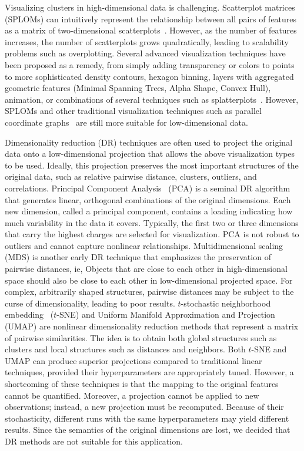 \documentclass[
  oneside]{book}
\begin{document}
Visualizing clusters in high-dimensional data is challenging.
Scatterplot matrices (SPLOMs) can intuitively represent the
relationship between all pairs of features as a matrix of two-dimensional scatterplots~\autocite{Im:GPLOM2013,Klemm:RegressionHeatmap2015}.
However, as the number of features increases, the number of scatterplots grows quadratically, leading to scalability problems such as overplotting.
Several advanced visualization techniques have been proposed as a remedy, from simply adding transparency or colors to points to more sophisticated density contours, hexagon binning, layers with aggregated geometric features (Minimal Spanning Trees, Alpha Shape, Convex Hull), animation, or combinations of several techniques such as
splatterplots~\autocite{Mayorga:Splatterplots2013}.
However, SPLOMs and other traditional visualization techniques such as parallel coordinate graphs~\autocite{Hartigan:PCC1975} are still more suitable for low-dimensional data.

Dimensionality reduction (DR) techniques are often used to project the original data onto a low-dimensional projection that allows the above visualization types to be used.
Ideally, this projection preserves the most important structures of the original data, such as relative pairwise distance, clusters, outliers, and correlations.
Principal Component Analysis~\autocite{Hotelling:PCA1933} (PCA) is a seminal DR algorithm that generates linear, orthogonal combinations of the original dimensions.
Each new dimension, called a principal component, contains a loading indicating how much variability in the data it covers.
Typically, the first two or three dimensions that carry the highest charges are selected for visualization.
PCA is not robust to outliers and cannot capture nonlinear relationships.
Multidimensional scaling~\autocite{Gower:MDS1966} (MDS) is another early DR technique that emphasizes the preservation of pairwise distances, ie,
Objects that are close to each other in high-dimensional space should also be close to each other in low-dimensional projected space.
For complex, arbitrarily shaped structures, pairwise distances may be subject to the curse of dimensionality, leading to poor results.
\(t\)-stochastic neighborhood embedding~\autocite{VanDerMaaten:tSNE2008} (\(t\)-SNE) and Uniform Manifold Approximation and Projection~\autocite{mcinnes2018umap} (UMAP) are nonlinear dimensionality reduction methods that represent a matrix of pairwise similarities.
The idea is to obtain both global structures such as clusters and local structures such as distances and neighbors.
Both \(t\)-SNE and UMAP can produce superior projections compared to traditional linear techniques, provided their hyperparameters are appropriately tuned.
However, a shortcoming of these techniques is that the mapping to the original features cannot be quantified.
Moreover, a projection cannot be applied to new observations; instead, a new projection must be recomputed.
Because of their stochasticity, different runs with the same hyperparameters may yield different results.
Since the semantics of the original dimensions are lost, we decided that DR methods are not suitable for this application.
\end{document}
